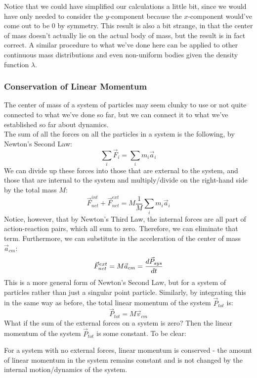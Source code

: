 Notice that we could have simplified our calculations a little bit, since we would have only needed to consider the $y$-component because the $x$-component would've come out to be $0$ by symmetry. This result is also a bit strange, in that the center of mass doesn't actually lie on the actual body of mass, but the result is in fact correct. A similar procedure to what we've done here can be applied to other continuous mass distributions and even non-uniform bodies given the density function $\lambda$.

\subsubsection{Conservation of Linear Momentum}
The center of mass of a system of particles may seem clunky to use or not quite connected to what we've done so far, but we can connect it to what we've established so far about dynamics. \\
The sum of all the forces on all the particles in a system is the following, by Newton's Second Law: 
\[
	\sum_i \vec F_i = \sum_i m_i \vec a_i 
\]
We can divide up these forces into those that are external to the system, and those that are internal to the system and multiply/divide on the right-hand side by the total mass $M$: 
\[
	\vec F_{net}^{int} + \vec F_{net}^{ext} = M \frac{1}{M}\sum_i m_i \vec a_i 
\]
Notice, however, that by Newton's Third Law, the internal forces are all part of action-reaction pairs, which all sum to zero. Therefore, we can eliminate that term. Furthermore, we can substitute in the acceleration of the center of mass $\vec a_{cm}$:
\[
	\vec F_{net}^{ext} = M \vec a_{cm} = \frac{d \vec P_{sys}}{d t}
\]
This is a more general form of Newton's Second Law, but for a system of particles rather than just a singular point particle. Similarly, by integrating this in the same way as before, the total linear momentum of the system $\vec P_{tot}$ is:
\[
	\vec P_{tot} = M \vec v_{cm}
\]
What if the sum of the external forces on a system is zero? Then the linear momentum of the system $\vec P_{tot}$ is some constant. To be clear: 
\begin{mdframed}[frametitle=Conservation of Linear Momentum]
For a system with no external forces, linear momentum is conserved - the amount of linear momentum in the system remains constant and is not changed by the internal motion/dynamics of the system.
\end{mdframed}
